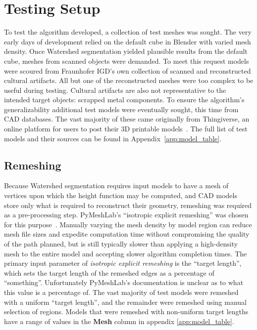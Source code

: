 
\section{Testing Setup}

To test the algorithm developed, a collection of test meshes was sought.
The very early days of development relied on the default cube in Blender with varied mesh density.
Once Watershed segmentation yielded plausible results from the default cube, meshes from scanned objects were demanded.
To meet this request models were scoured from Fraunhofer IGD's own collection of scanned and reconstructed cultural artifacts.
All but one of the reconstructed meshes were too complex to be useful during testing.
Cultural artifacts are also not representative to the intended target objects: scrapped metal components.
To ensure the algorithm's generalizability additional test models were eventually sought, this time from CAD databases.
The vast majority of these came originally from Thingiverse, an online platform for users to post their 3D printable models~\cite{Thingiverse}.
The full list of test models and their sources can be found in Appendix~\ref{app:model_table}.

\subsection{Remeshing}
Because Watershed segmentation requires input models to have a mesh of vertices upon which the height function may be computed, and CAD models store only what is required to reconstruct their geometry, remeshing was required as a pre-processing step.
PyMeshLab's ``isotropic explicit remeshing'' was chosen for this purpose~\cite{PyMeshLab}.
Manually varying the mesh density by model region can reduce mesh file sizes and expedite computation time without compromising the quality of the path planned, but is still typically slower than applying a high-density mesh to the entire model and accepting slower algorithm completion times.
The primary input parameter of \textit{isotropic explicit remeshing} is the ``target length'', which sets the target length of the remeshed edges as a percentage of ``something''.
Unfortunately PyMeshLab's documentation is unclear as to what this value is a percentage of.
The vast majority of test models were remeshed with a uniform ``target length'', and the remainder were remeshed using manual selection of regions.
Models that were remeshed with non-uniform target lengths have a range of values in the \textbf{Mesh} column in appendix \ref{app:model_table}.

